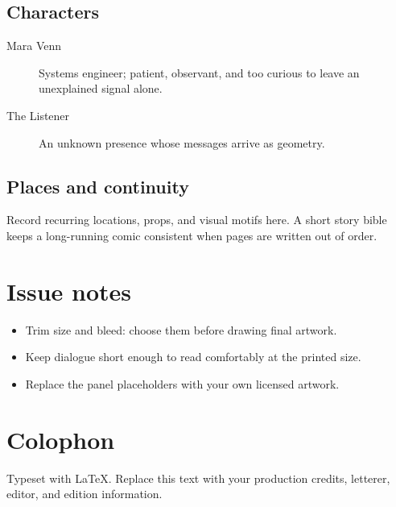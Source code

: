 \documentclass[11pt]{book}
\begin{document}
\section{Characters}
\begin{description}
  \item[Mara Venn] Systems engineer; patient, observant, and too curious to
  leave an unexplained signal alone.
  \item[The Listener] An unknown presence whose messages arrive as geometry.
\end{description}
\section{Places and continuity}
Record recurring locations, props, and visual motifs here. A short story bible
keeps a long-running comic consistent when pages are written out of order.
\chapter*{Issue notes}
\begin{itemize}
  \item Trim size and bleed: choose them before drawing final artwork.
  \item Keep dialogue short enough to read comfortably at the printed size.
  \item Replace the panel placeholders with your own licensed artwork.
\end{itemize}
\backmatter
\chapter*{Colophon}
Typeset with \LaTeX{}. Replace this text with your production credits,
letterer, editor, and edition information.
\end{document}
